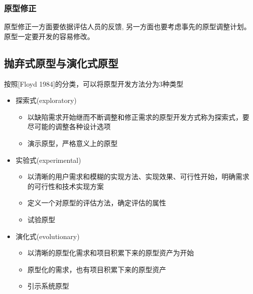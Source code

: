 \subsubsection{原型修正}
原型修正一方面要依据评估人员的反馈, 另一方面也要考虑事先的原型调整计划。原型一定要开发的容易修改。


\subsection{抛弃式原型与演化式原型}
按照[Floyd 1984]的分类，可以将原型开发方法分为3种类型
\begin{itemize}
    \item 探索式(exploratory)
    \begin{itemize}
        \item 以缺陷需求开始继而不断调整和修正需求的原型开发方式称为探索式，要尽可能的调整各种设计选项
        \item 演示原型，严格意义上的原型
    \end{itemize}
    \item 实验式(experimental)
    \begin{itemize}
        \item 以清晰的用户需求和模糊的实现方法、实现效果、可行性开始，明确需求的可行性和技术实现方案
        \item 定义一个对原型的评估方法，确定评估的属性
        \item 试验原型
    \end{itemize}
    \item 演化式(evolutionary)
    \begin{itemize}
        \item 以清晰的原型化需求和项目积累下来的原型资产为开始
        \item 原型化的需求，也有项目积累下来的原型资产 
        \item 引示系统原型
    \end{itemize}
\end{itemize}

\setlength{\TPHorizModule}{\textwidth}
\setlength{\TPVertModule}{\textwidth}
 

